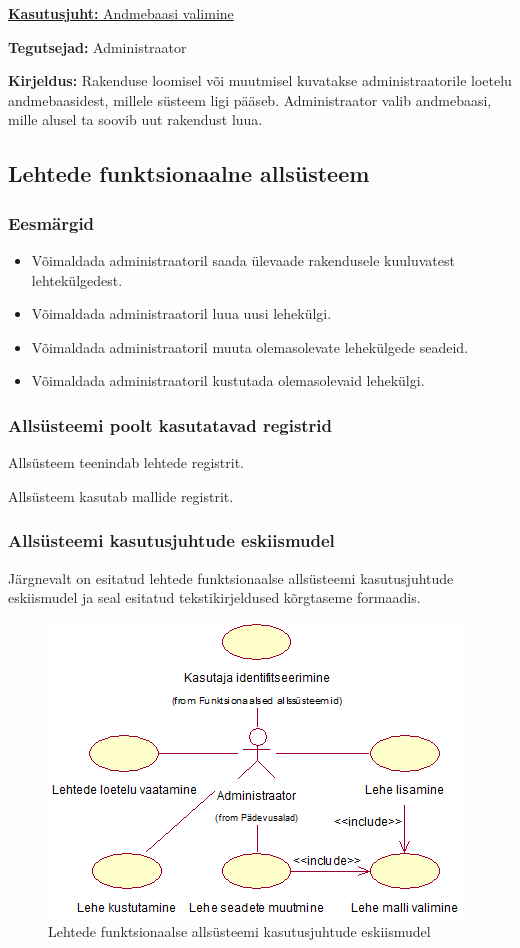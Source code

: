 \documentclass[a4paper,12pt]{article} %
\begin{document}
\underline{\textbf{Kasutusjuht:} Andmebaasi valimine}
\par
\textbf{Tegutsejad:} Administraator
\par
\textbf{Kirjeldus:} Rakenduse loomisel või muutmisel kuvatakse administraatorile loetelu andmebaasidest, millele süsteem ligi pääseb. Administraator valib andmebaasi, mille alusel ta soovib uut rakendust luua.
\par
\subsection{Lehtede funktsionaalne allsüsteem}
\subsubsection{Eesmärgid}
\begin{itemize}
\item Võimaldada administraatoril saada ülevaade rakendusele kuuluvatest lehtekülgedest.
\item Võimaldada administraatoril luua uusi lehekülgi.
\item Võimaldada administraatoril muuta olemasolevate lehekülgede seadeid.
\item Võimaldada administraatoril kustutada olemasolevaid lehekülgi.
\end{itemize}
\subsubsection{Allsüsteemi poolt kasutatavad registrid}
Allsüsteem teenindab lehtede registrit.\par
Allsüsteem kasutab mallide registrit.
\subsubsection{Allsüsteemi kasutusjuhtude eskiismudel}
Järgnevalt on esitatud lehtede funktsionaalse allsüsteemi kasutusjuhtude eskiismudel ja seal esitatud tekstikirjeldused kõrgtaseme formaadis.
\begin{figure}[H]
\begin{center}
\includegraphics[bb=0 0 415 296,scale=1]{./diagrams/pages-subsystem-use-case-digram.png}
\caption{Lehtede funktsionaalse allsüsteemi kasutusjuhtude eskiismudel}
\end{center}
\end{figure}
\end{document}
